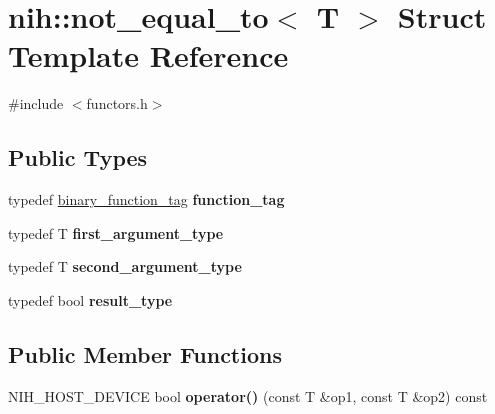 \hypertarget{structnih_1_1not__equal__to}{
\section{nih\-:\-:not\-\_\-equal\-\_\-to$<$ \-T $>$ \-Struct \-Template \-Reference}
\label{structnih_1_1not__equal__to}
}


{\ttfamily \#include $<$functors.\-h$>$}

\subsection*{\-Public \-Types}
\begin{DoxyCompactItemize}
\item 
\hypertarget{structnih_1_1not__equal__to_a49afb46cd270a213ecec12c0d0626f44}{
typedef \hyperlink{structnih_1_1binary__function__tag}{binary\-\_\-function\-\_\-tag} {\bfseries function\-\_\-tag}}
\label{structnih_1_1not__equal__to_a49afb46cd270a213ecec12c0d0626f44}

\item 
\hypertarget{structnih_1_1not__equal__to_a92be687e1dae5e85e7a59d13515bf904}{
typedef \-T {\bfseries first\-\_\-argument\-\_\-type}}
\label{structnih_1_1not__equal__to_a92be687e1dae5e85e7a59d13515bf904}

\item 
\hypertarget{structnih_1_1not__equal__to_a9e5aa1f364d848b2d43d41a02a52c585}{
typedef \-T {\bfseries second\-\_\-argument\-\_\-type}}
\label{structnih_1_1not__equal__to_a9e5aa1f364d848b2d43d41a02a52c585}

\item 
\hypertarget{structnih_1_1not__equal__to_aff508f5bd79507f64627c547426e9a16}{
typedef bool {\bfseries result\-\_\-type}}
\label{structnih_1_1not__equal__to_aff508f5bd79507f64627c547426e9a16}

\end{DoxyCompactItemize}
\subsection*{\-Public \-Member \-Functions}
\begin{DoxyCompactItemize}
\item 
\hypertarget{structnih_1_1not__equal__to_a0bc7640f85ad53639424298d954f7ef9}{
\-N\-I\-H\-\_\-\-H\-O\-S\-T\-\_\-\-D\-E\-V\-I\-C\-E bool {\bfseries operator()} (const \-T \&op1, const \-T \&op2) const }
\label{structnih_1_1not__equal__to_a0bc7640f85ad53639424298d954f7ef9}

\end{DoxyCompactItemize}


